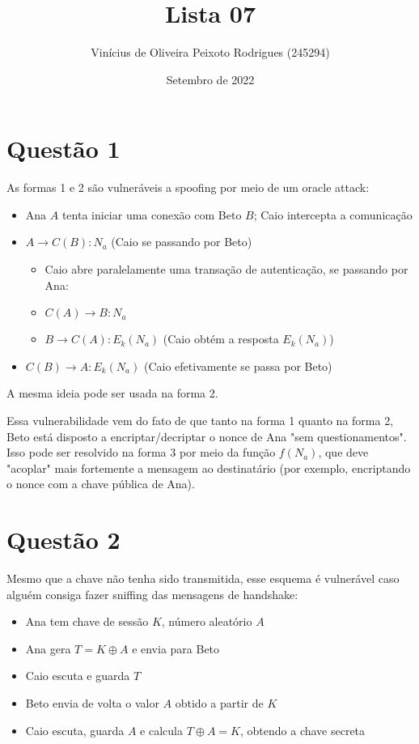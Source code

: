 \documentclass{article}
\title{Lista 07}
\author{Vinícius de Oliveira Peixoto Rodrigues (245294)}
\date{Setembro de 2022}
\begin{document}
\maketitle

\section*{Questão 1}

As formas 1 e 2 são vulneráveis a spoofing por meio de um oracle attack:

\begin{itemize}
    \item Ana $A$ tenta iniciar uma conexão com Beto $B$; Caio intercepta a comunicação
    \item $A \rightarrow C(B): N_a$ (Caio se passando por Beto)
    \begin{itemize}
        \item Caio abre paralelamente uma transação de autenticação, se passando por Ana:
        \item $C(A) \rightarrow B: N_a$
        \item $B \rightarrow C(A): E_k(N_a)$ (Caio obtém a resposta $E_k(N_a)$)
    \end{itemize}
    \item $C(B) \rightarrow A: E_k(N_a)$ (Caio efetivamente se passa por Beto)
\end{itemize}

A mesma ideia pode ser usada na forma 2.

Essa vulnerabilidade vem do fato de que tanto na forma 1 quanto na forma 2, Beto está disposto a encriptar/decriptar o nonce de Ana "sem questionamentos". Isso pode ser resolvido na forma 3 por meio da função $f(N_a)$, que deve "acoplar" mais fortemente a mensagem ao destinatário (por exemplo, encriptando o nonce com a chave pública de Ana).

\section*{Questão 2}

Mesmo que a chave não tenha sido transmitida, esse esquema é vulnerável caso alguém consiga fazer sniffing das mensagens de handshake:

\begin{itemize}
    \item Ana tem chave de sessão $K$, número aleatório $A$
    \item Ana gera $T = K \oplus A$ e envia para Beto
    \item Caio escuta e guarda $T$
    \item Beto envia de volta o valor $A$ obtido a partir de $K$
    \item Caio escuta, guarda $A$ e calcula $T \oplus A = K$, obtendo a chave secreta
\end{itemize}
\end{document}
